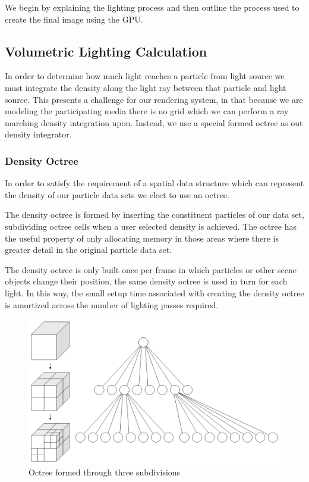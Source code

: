 \documentclass{article}
\begin{document}
We begin by explaining the lighting process and then outline the process used to create the final image using the GPU.

\subsection{Volumetric Lighting Calculation}

In order to determine how much light reaches a particle from light source we must integrate the density along the light ray between that particle and light source. This presents a challenge for our rendering system, in that because we are modeling the participating media there is no grid which we can perform a ray marching density integration upon. Instead, we use a special formed octree as out density integrator.

\subsubsection{Density Octree}

In order to satisfy the requirement of a spatial data structure which can represent the density of our particle data sets we elect to use an octree.

The density octree is formed by inserting the constituent particles of our data set, subdividing octree cells when a user selected density is achieved. The octree has the useful property of only allocating memory in those areas where there is greater detail in the original particle data set.

The density octree is only built once per frame in which particles or other scene objects change their position, the same density octree is used in turn for each light. In this way, the small setup time associated with creating the density octree is amortized across the number of lighting passes required. 

\begin{figure}[h!]
	\centering
	\includegraphics[scale=0.3]{Images/Octree}
	\caption{Octree formed through three subdivisions}
\end{figure}
\end{document}
